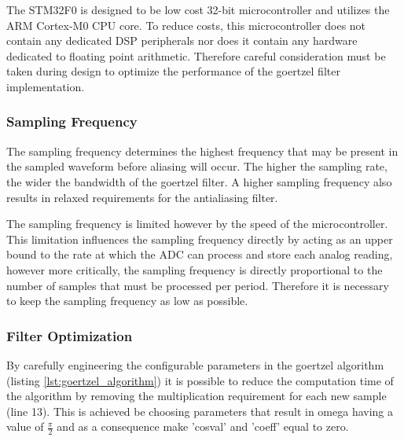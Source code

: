 The STM32F0 is designed to be low cost 32-bit microcontroller and utilizes the ARM Cortex-M0 CPU core. To reduce costs, this microcontroller does not contain any dedicated DSP peripherals nor does it contain any hardware dedicated to floating point arithmetic. Therefore careful consideration must be taken during design to optimize the performance of the goertzel filter implementation.

\subsubsection{Sampling Frequency}
The sampling frequency determines the highest frequency that may be present in the sampled waveform before aliasing will occur. The higher the sampling rate, the wider the bandwidth of the goertzel filter. A higher sampling frequency also results in relaxed requirements for the antialiasing filter.

The sampling frequency is limited however by the speed of the microcontroller. This limitation influences the sampling frequency directly by acting as an upper bound to the rate at which the ADC can process and store each analog reading, however more critically, the sampling frequency is directly proportional to the number of samples that must be processed per period. Therefore it is necessary to keep the sampling frequency as low as possible.

\subsubsection{Filter Optimization}
By carefully engineering the configurable parameters in the goertzel algorithm (listing \ref{lst:goertzel_algorithm}) it is possible to reduce the computation time of the algorithm by removing the multiplication requirement for each new sample (line 13). This is achieved be choosing parameters that result in omega having a value of \(\frac{\pi}{2}\) and as a consequence make 'cosval' and 'coeff' equal to zero.








